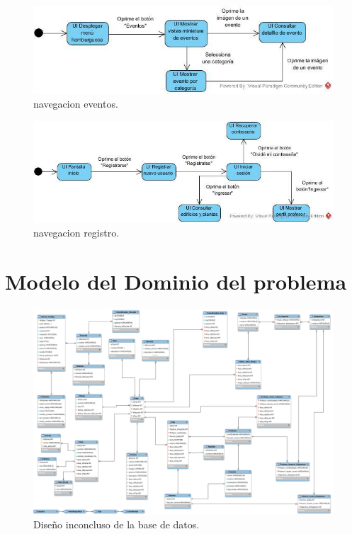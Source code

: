 \documentclass[oneside,10pt]{book}
\begin{document}
	\begin{figure}[htbp!]
		\centering
			\includegraphics[width=.5\textwidth]{mapa_nave/imagenesnav/eventos}
		\caption{navegacion eventos.}
	\end{figure}
	
	\begin{figure}[htbp!]
		\centering
			\includegraphics[width=.5\textwidth]{mapa_nave/imagenesnav/registro}
		\caption{navegacion registro.}
	\end{figure}


\chapter{Modelo del Dominio del problema}

	\begin{figure}[htbp!]
		\centering
			\includegraphics[width=1\textwidth]{images/baseDeDatos}
		\caption{Diseño inconcluso de la base de datos.}
	\end{figure}



\end{document}
